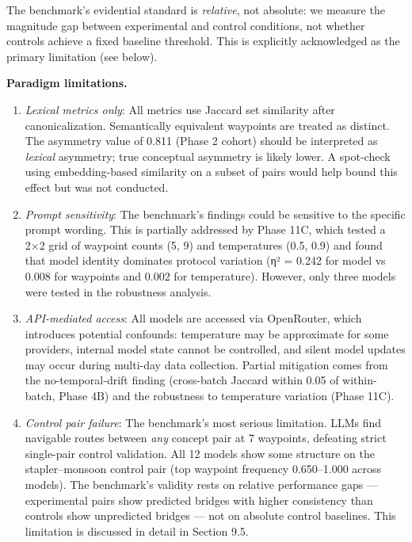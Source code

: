 The benchmark's evidential standard is \emph{relative}, not absolute: we measure the magnitude gap between experimental and control conditions, not whether controls achieve a fixed baseline threshold. This is explicitly acknowledged as the primary limitation (see below).

\textbf{Paradigm limitations.}

\begin{enumerate}
\def\labelenumi{\arabic{enumi}.}
\item
  \emph{Lexical metrics only}: All metrics use Jaccard set similarity after canonicalization. Semantically equivalent waypoints are treated as distinct. The asymmetry value of 0.811 (Phase 2 cohort) should be interpreted as \emph{lexical} asymmetry; true conceptual asymmetry is likely lower. A spot-check using embedding-based similarity on a subset of pairs would help bound this effect but was not conducted.
\item
  \emph{Prompt sensitivity}: The benchmark's findings could be sensitive to the specific prompt wording. This is partially addressed by Phase 11C, which tested a 2×2 grid of waypoint counts (5, 9) and temperatures (0.5, 0.9) and found that model identity dominates protocol variation (η² = 0.242 for model vs 0.008 for waypoints and 0.002 for temperature). However, only three models were tested in the robustness analysis.
\item
  \emph{API-mediated access}: All models are accessed via OpenRouter, which introduces potential confounds: temperature may be approximate for some providers, internal model state cannot be controlled, and silent model updates may occur during multi-day data collection. Partial mitigation comes from the no-temporal-drift finding (cross-batch Jaccard within 0.05 of within-batch, Phase 4B) and the robustness to temperature variation (Phase 11C).
\item
  \emph{Control pair failure}: The benchmark's most serious limitation. LLMs find navigable routes between \emph{any} concept pair at 7 waypoints, defeating strict single-pair control validation. All 12 models show some structure on the stapler--monsoon control pair (top waypoint frequency 0.650--1.000 across models). The benchmark's validity rests on relative performance gaps --- experimental pairs show predicted bridges with higher consistency than controls show unpredicted bridges --- not on absolute control baselines. This limitation is discussed in detail in Section 9.5.
\end{enumerate}

